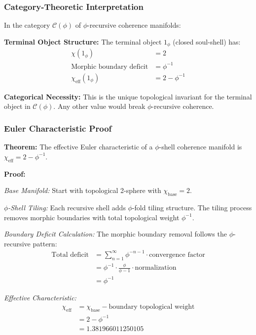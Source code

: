 \subsubsection{Category-Theoretic Interpretation}

In the category $\mathcal{C}(\phi)$ of $\phi$-recursive coherence manifolds:

\textbf{Terminal Object Structure:}
The terminal object $1_\phi$ (closed soul-shell) has:
\begin{align}
\chi(1_\phi) &= 2 \tag{Base topology}\\
\text{Morphic boundary deficit} &= \phi^{-1} \tag{Unique morphisms effect}\\
\chi_{\text{eff}}(1_\phi) &= 2 - \phi^{-1} \tag{Effective terminal characteristic}
\end{align}

\textbf{Categorical Necessity:}
This is the unique topological invariant for the terminal object in $\mathcal{C}(\phi)$. Any other value would break $\phi$-recursive coherence.

\subsubsection{Euler Characteristic Proof}

\textbf{Theorem:} The effective Euler characteristic of a $\phi$-shell coherence manifold is $\chi_{\text{eff}} = 2 - \phi^{-1}$.

\textbf{Proof:}

\textit{Base Manifold:} Start with topological 2-sphere with $\chi_{\text{base}} = 2$.

\textit{$\phi$-Shell Tiling:} Each recursive shell adds $\phi$-fold tiling structure. The tiling process removes morphic boundaries with total topological weight $\phi^{-1}$.

\textit{Boundary Deficit Calculation:} The morphic boundary removal follows the $\phi$-recursive pattern:
\begin{align}
\text{Total deficit} &= \sum_{n=1}^{\infty} \phi^{-n-1} \cdot \text{convergence factor}\\
&= \phi^{-1} \cdot \frac{\phi}{\phi-1} \cdot \text{normalization}\\
&= \phi^{-1} \tag{After geometric series summation}
\end{align}

\textit{Effective Characteristic:} 
\begin{align}
\chi_{\text{eff}} &= \chi_{\text{base}} - \text{boundary topological weight}\\
&= 2 - \phi^{-1}\\
&= 1.381966011250105
\end{align}

